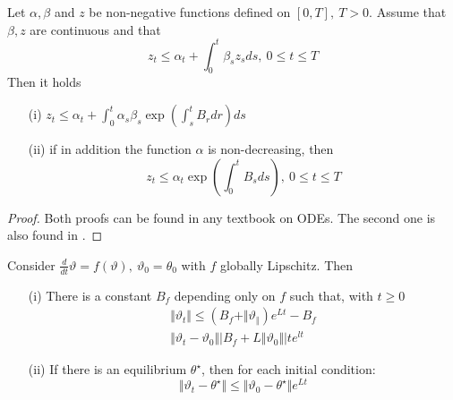 \begin{proposition}\label{prop:26}
    Let \(\alpha,\beta\) and \(z\) be non-negative functions defined on 
    \([0,T],\ T>0\). Assume that \(\beta,z\) are continuous and that 
    \[z_t\leq \alpha_t+\int_0^t\beta_s z_sds,\ 0\leq t\leq T\]
    Then it holds
    \begin{enumerate}
        \item[(i)] \(z_t\leq \alpha_t+\int_0^t \alpha_s \beta_s \exp\left(\int_s^t B_r dr\right)ds\)
        \item[(ii)] if in addition the function \(\alpha\) is non-decreasing, then \[z_t\leq \alpha_t\exp\left(\int_0^t B_sds\right),\ 0\leq t\leq T\] 
    \end{enumerate} 
\end{proposition}

\begin{proof}
    Both proofs can be found in any textbook on ODEs. 
    The second one is also found in \cite{Meyn_2022}.
\end{proof}

\begin{proposition}\label{prop:27}
    Consider \(\frac{d}{dt}\vartheta=f(\vartheta),\ \vartheta_0=\theta_0\) with \(f\) globally Lipschitz. Then 
    \begin{enumerate}
        \item[(i)] There is a constant \(B_f\) depending only on \(f\) such that, with \(t\geq 0\)
                   \begin{eqnarray}\Vert \vartheta_t\Vert \leq \left(B_f+\Vert \vartheta_\Vert\right)e^{Lt}-B_f\\
                    \Vert \vartheta_t-\vartheta_0\Vert \vert  B_f+L\Vert \vartheta_0\Vert \vert t e^{lt}
                   \end{eqnarray}
        \item[(ii)] If there is an equilibrium \(\theta^\star\), then for each initial condition:
                   \begin{equation}
                        \Vert \vartheta_t-\theta^\star\Vert \leq \Vert \vartheta_0-\theta^\star\Vert e^{Lt}
                   \end{equation}
    \end{enumerate}
\end{proposition}

